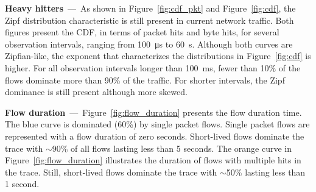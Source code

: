 \textbf{Heavy hitters}~---~As shown in Figure~\ref{fig:cdf_pkt} and Figure~\ref{fig:cdf}, the Zipf distribution characteristic is still present in current network traffic.
Both figures present the CDF, in terms of packet hits and byte hits, for several observation intervals, ranging from \SI{100}{\micro\second} to \SI{60}{\second}.
Although both curves are Zipfian-like, the exponent that characterizes the distributions in Figure~\ref{fig:cdf} is higher.
For all observation intervals longer than \SI{100}{\milli\second}, fewer than 10\% of the flows dominate more than 90\% of the traffic.
For shorter intervals, the Zipf dominance is still present although more skewed.

\textbf{Flow duration}~---~Figure~\ref{fig:flow_duration} presents the flow duration time.
The blue curve is dominated (60\%) by single packet flows.
Single packet flows are represented with a flow duration of zero seconds.
Short-lived flows dominate the trace with $\sim$90\% of all flows lasting less than 5 seconds.
The orange curve in Figure~\ref{fig:flow_duration} illustrates the duration of flows with multiple hits in the trace.
Still, short-lived flows dominate the trace with $\sim$50\% lasting less than 1 second.%

